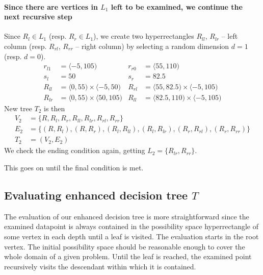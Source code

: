 \begin{example}
    \paragraph{Since there are vertices in $L_1$ left to be examined, we continue the next recursive step}
    Since $R_l \in L_1$ (resp. $R_r \in L_1$), we create two hyperrectangles $R_{ll}$, $R_{lr}$ -- left column (resp. $R_{rl}$, $R_{rr}$ -- right column) by selecting a random dimension $d=1$ (resp. $d=0$).
    \begin{align*}
        r_{l1} &= \langle -5, 105)& r_{r0} &= \langle 55, 110) \\
        s_l &= 50 & s_r&=82.5\\
        R_{ll} &= \langle 0, 55) \times \langle -5,50) & R_{rl} &= \langle 55, 82.5) \times \langle -5,105)\\
        R_{lr} &= \langle 0, 55) \times \langle 50,105) & R_{ll} &= \langle 82.5, 110) \times \langle -5,105)
    \end{align*}
 New tree $T_2$ is then
    \begin{align*}
        V_2 &= \{R, R_l, R_r, R_{ll}, R_{lr}, R_{rl}, R_{rr}\} \\
        E_2 &= \{(R, R_l), (R, R_r), (R_l, R_{ll}), (R_l, R_{lr}), (R_r, R_{rl}), (R_r, R_{rr})\} \\
        T_2 &= (V_2, E_2)
    \end{align*}
 We check the ending condition again, getting $L_2 = \{R_{lr}, R_{rr}\}$.

    This goes on until the final condition is met.
\end{example}

\subsection{Evaluating enhanced decision tree $T$}
The evaluation of our enhanced decision tree is more straightforward since the examined datapoint is always contained in the possibility space hyperrectangle of some vertex in each depth until a leaf is visited.
The evaluation starts in the root vertex. The initial possibility space should be reasonable enough to cover the whole domain of a given problem.
Until the leaf is reached, the examined point recursively visits the descendant within which it is contained.



